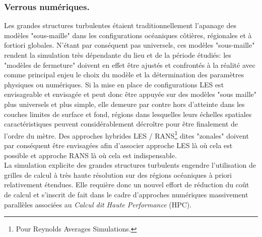 \subsubsection{Verrous numériques.}
Les grandes structures turbulentes étaient traditionnellement l'apanage des modèles "sous-maille" dans les configurations océaniques côtières, régionales et à fortiori globales. N'étant par conséquent pas universels, ces modèles "sous-maille" rendent la simulation très dépendante du lieu et de la période étudiés: les "modèles de fermeture" doivent en effet être ajustés et confrontés à la réalité avec comme principal enjeu le choix du modèle et la détermination des paramètres physiques ou numériques. Si la mise en place de configurations LES est envisageable et envisagée et peut donc être appuyée sur des modèles "sous maille" plus universels et plus simple, elle demeure par contre hors d’atteinte dans les couches limites de surface et fond, régions dans lesquelles leurs échelles spatiales caractéristiques peuvent considérablement décroître pour être finalement de l'ordre du mètre. Des approches hybrides LES / RANS\footnote{Pour Reynolds Averages Simulations.} dites "zonales" doivent par conséquent être envisagées \citep{friess_modelisation_2010} afin d'associer approche LES là où cela est possible et approche RANS là où cela est indispensable.\\
La simulation explicite des grandes structures turbulents engendre l'utilisation de grilles de calcul à très haute résolution sur des régions océaniques à priori relativement étendues. Elle requière donc un nouvel effort de réduction du coût de calcul et s'inscrit de fait dans le cadre d'approches numériques massivement parallèles associées au \textit{Calcul dit Haute Performance} (HPC).

\color{black}
